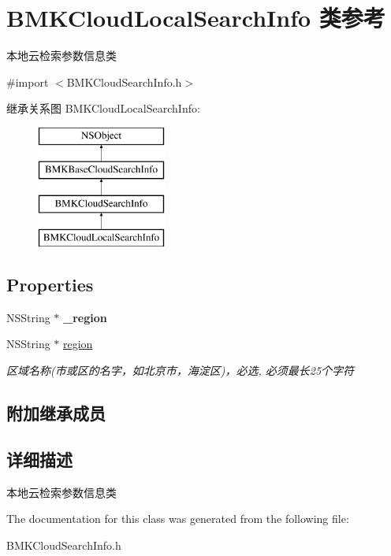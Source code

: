 \hypertarget{interface_b_m_k_cloud_local_search_info}{\section{B\-M\-K\-Cloud\-Local\-Search\-Info 类参考}
\label{interface_b_m_k_cloud_local_search_info}
}


本地云检索参数信息类  




{\ttfamily \#import $<$B\-M\-K\-Cloud\-Search\-Info.\-h$>$}

继承关系图 B\-M\-K\-Cloud\-Local\-Search\-Info\-:\begin{figure}[H]
\begin{center}
\leavevmode
\includegraphics[height=4.000000cm]{interface_b_m_k_cloud_local_search_info}
\end{center}
\end{figure}
\subsection*{Properties}
\begin{DoxyCompactItemize}
\item 
\hypertarget{interface_b_m_k_cloud_local_search_info_a222e06088269c5b3e67d3f9a416d7eff}{N\-S\-String $\ast$ {\bfseries \-\_\-region}}\label{interface_b_m_k_cloud_local_search_info_a222e06088269c5b3e67d3f9a416d7eff}

\item 
\hypertarget{interface_b_m_k_cloud_local_search_info_a0f5a080b5eed8356479c5b3f3e483e29}{N\-S\-String $\ast$ \hyperlink{interface_b_m_k_cloud_local_search_info_a0f5a080b5eed8356479c5b3f3e483e29}{region}}\label{interface_b_m_k_cloud_local_search_info_a0f5a080b5eed8356479c5b3f3e483e29}

\begin{DoxyCompactList}\small\item\em 区域名称(市或区的名字，如北京市，海淀区)，必选, 必须最长25个字符 \end{DoxyCompactList}\end{DoxyCompactItemize}
\subsection*{附加继承成员}


\subsection{详细描述}
本地云检索参数信息类 

The documentation for this class was generated from the following file\-:\begin{DoxyCompactItemize}
\item 
B\-M\-K\-Cloud\-Search\-Info.\-h\end{DoxyCompactItemize}
